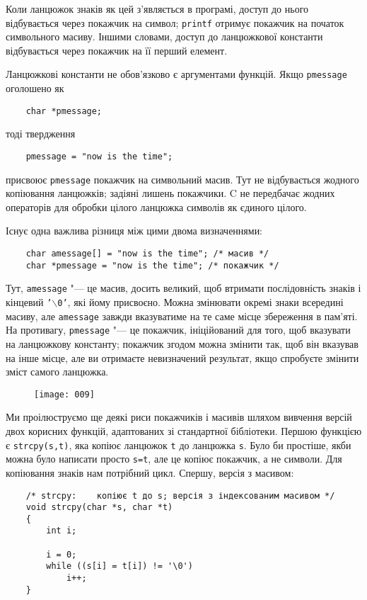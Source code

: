 \documentclass[a4paper,12pt]{book}
\begin{document}
  Коли ланцюжок знаків як цей з'являється в програмі, доступ до нього відбувається через
  покажчик на символ; \texttt{printf} отримує покажчик на початок символьного масиву.
  Іншими словами, доступ до ланцюжкової константи відбувається через покажчик на її перший
  елемент.

  Ланцюжкові константи не обов'язково є аргументами функцій. Якщо
  \texttt{pmessage} оголошено як
  \begin{verbatim}
    char *pmessage;
  \end{verbatim}
  тоді твердження
  \begin{verbatim}
    pmessage = "now is the time";
  \end{verbatim}
  присвоює
  \texttt{pmessage} покажчик на символьний масив. Тут не відбувається жодного копіювання
  ланцюжків; задіяні лишень покажчики. C не передбачає жодних операторів для обробки
  цілого ланцюжка символів як єдиного цілого.

  Існує одна важлива різниця між цими двома визначеннями:
  \begin{verbatim}
    char amessage[] = "now is the time"; /* масив */
    char *pmessage = "now is the time"; /* покажчик */
  \end{verbatim}

  Тут, \texttt{amessage} "--- це масив, досить великий, щоб втримати послідовність
  знаків і кінцевий \texttt{'\mbox{$\backslash$}0'}, які йому присвоєно. Можна змінювати окремі знаки
  всередині масиву, але \texttt{amessage} завжди вказуватиме на те саме місце збереження в
  пам'яті. На противагу, \texttt{pmessage} "--- це покажчик, ініційований для того, щоб
  вказувати на ланцюжкову константу; покажчик згодом можна змінити так, щоб він вказував
  на інше місце, але ви отримаєте невизначений результат, якщо спробуєте змінити зміст
  самого ланцюжка.

%

  \begin{figure}[!htb]
  \centering
  \texttt{[image: 009]}
  \end{figure}

  Ми проілюструємо ще деякі риси покажчиків і масивів шляхом вивчення версій двох корисних
  функцій, адаптованих зі стандартної бібліотеки. Першою функцією є \texttt{strcpy(s,t)},
  яка копіює ланцюжок \texttt{t} до ланцюжка \texttt{s}. Було би простіше, якби можна було
  написати просто \texttt{s=t}, але це копіює покажчик, а не символи. Для копіювання
  знаків нам потрібний цикл. Спершу, версія з масивом:
  \begin{verbatim}
    /* strcpy:    копіює t до s; версія з індексованим масивом */
    void strcpy(char *s, char *t)
    {
        int i;

        i = 0;
        while ((s[i] = t[i]) != '\0')
            i++;
    }
  \end{verbatim}
\end{document}
